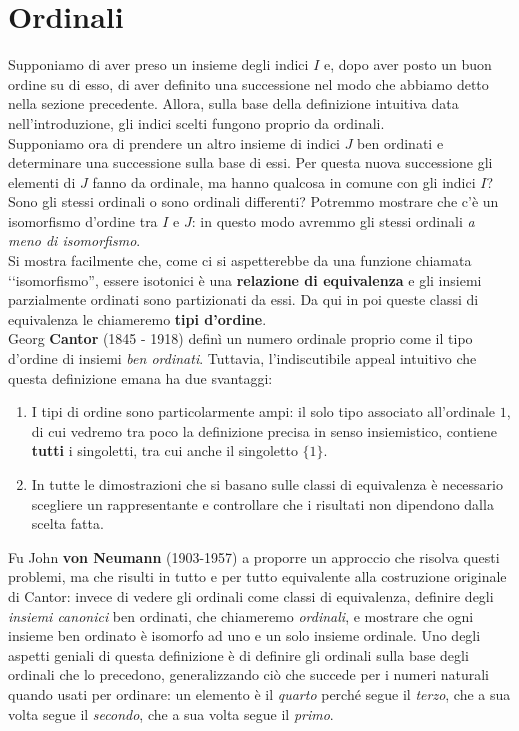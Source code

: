 \section{Ordinali}
Supponiamo di aver preso un insieme degli indici $I$ e, dopo aver posto un buon ordine su di esso, di aver definito una successione nel modo che abbiamo detto nella sezione precedente. Allora, sulla base della definizione intuitiva data nell'introduzione, gli indici scelti fungono proprio da ordinali.\\
Supponiamo ora di prendere un altro insieme di indici $J$ ben ordinati e determinare una successione sulla base di essi. Per questa nuova successione gli elementi di $J$ fanno da ordinale, ma hanno qualcosa in comune con gli indici $I$? Sono gli stessi ordinali o sono ordinali differenti? Potremmo mostrare che c'è un isomorfismo d'ordine tra $I$ e $J$: in questo modo avremmo gli stessi ordinali \textit{a meno di isomorfismo}.\\
Si mostra facilmente che, come ci si aspetterebbe da una funzione chiamata ‘‘isomorfismo'', essere isotonici è una \textbf{relazione di equivalenza} e gli insiemi parzialmente ordinati sono partizionati da essi. Da qui in poi queste classi di equivalenza le chiameremo \textbf{tipi d'ordine}.\\
Georg \textbf{Cantor} (1845 - 1918) definì un numero ordinale proprio come il tipo d'ordine di insiemi \textit{ben ordinati}. Tuttavia, l'indiscutibile appeal intuitivo che questa definizione emana ha due svantaggi:
\begin{enumerate}
	\item I tipi di ordine sono particolarmente ampi: il solo tipo associato all'ordinale $1$, di cui vedremo tra poco la definizione precisa in senso insiemistico, contiene \textbf{tutti} i singoletti, tra cui anche il singoletto $\{1\}$.
	\item In tutte le dimostrazioni che si basano sulle classi di equivalenza è necessario scegliere un rappresentante e controllare che i risultati non dipendono dalla scelta fatta.
\end{enumerate}
Fu John \textbf{von Neumann} (1903-1957)  a proporre un approccio che risolva questi problemi, ma che risulti in tutto e per tutto equivalente alla costruzione originale di Cantor: invece di vedere gli ordinali come classi di equivalenza, definire degli \textit{insiemi canonici} ben ordinati, che chiameremo \textit{ordinali}, e mostrare che ogni insieme ben ordinato è isomorfo ad uno e un solo insieme ordinale. Uno degli aspetti geniali di questa definizione è di definire gli ordinali sulla base degli ordinali che lo precedono, generalizzando ciò che succede per i numeri naturali quando usati per ordinare: un elemento è il \textit{quarto} perché segue il \textit{terzo}, che a sua volta segue il \textit{secondo}, che a sua volta segue il \textit{primo}.\\
